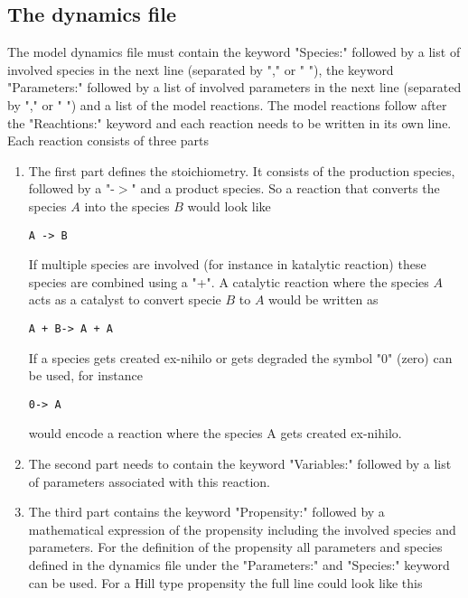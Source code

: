 \documentclass[11pt]{article} %
\begin{document}
\subsection{The dynamics file}
The model dynamics file must contain the keyword "Species:" followed by a list of involved species in the next line (separated by "," or " "), the keyword "Parameters:" followed by a list of involved parameters in the next line (separated by "," or " ") and a list of the model reactions. 
The model reactions follow after the "Reachtions:" keyword and each reaction needs to be written in its own line. 
Each reaction consists of three parts
\begin{enumerate}
\item The first part defines the stoichiometry. It consists of the production species, followed by a "-$>$" and a product species. So a reaction that converts the species $A$ into the species $B$ would look like 

\begin{tcolorbox}
\begin{verbatim}
A -> B
\end{verbatim}
\end{tcolorbox}


If multiple species are involved (for instance in katalytic reaction) these species are combined using a "+". A catalytic reaction where the species $A$ acts as a catalyst to convert specie $B$ to $A$ would be written as 

\begin{tcolorbox}
\begin{verbatim}
A + B-> A + A
\end{verbatim}
\end{tcolorbox}

If a species gets created ex-nihilo or gets degraded the symbol "0" (zero) can be used, for instance

\begin{tcolorbox}
\begin{verbatim}
0-> A
\end{verbatim}
\end{tcolorbox}

would encode a reaction where the species A gets created ex-nihilo. 

\item The second part needs to contain the keyword "Variables:" followed by a list of parameters associated with this reaction. 
\item The third part contains the keyword "Propensity:" followed by a mathematical expression of the propensity including the involved species and parameters. For the definition of the propensity all parameters and species defined in the dynamics file under the "Parameters:" and "Species:" keyword can be used. For a Hill type propensity the full line could look like this


\end{enumerate}
\end{document}
